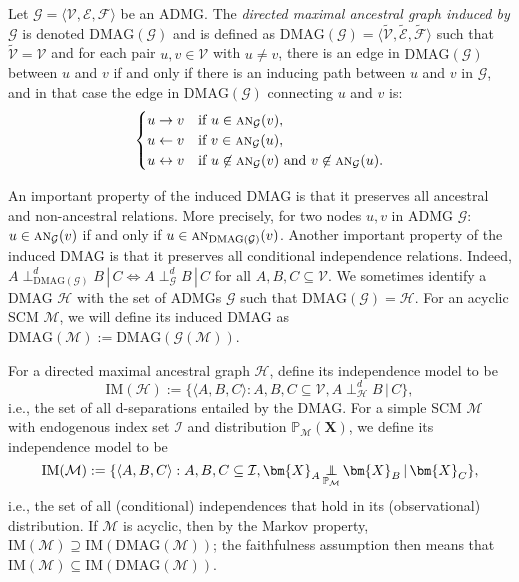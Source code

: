 \documentclass[twoside,11pt]{article}
\DeclareMathOperator*{\CI}{{\,\perp\mkern-12mu\perp\,}}
\DeclareMathOperator*{\SEP}{\perp}
\newcommand\indep[4]{{#1} \CI_{#4} {#2} \given {#3}}
\newcommand{\dsep}[4]{{#1} \SEP_{#4}^d {#2} \given {#3}}
\newcommand{\Prb}{\mathbb{P}}
\newcommand\B[1]{\bm{#1}}
\newcommand\C[1]{\mathcal{#1}}
\newcommand\mathbfsc[1]{\text{\normalfont\scshape#1}}
\newcommand\ansub[2]{\mathbfsc{an}_{#1}(#2)}
\newcommand\given{\,|\,}
\newcommand{\ot}{\leftarrow}
\newcommand{\oto}{\leftrightarrow}
\newcommand{\DMAG}{\mathrm{DMAG}}
\newcommand{\IM}{\mathrm{IM}}
\begin{document}
\begin{definition}
  Let $\C{G} = \langle \C{V}, \C{E}, \C{F} \rangle$ be an ADMG. 
  The \emph{directed maximal ancestral graph induced by $\C{G}$} is denoted $\DMAG(\C{G})$ and is defined as
  $\DMAG(\C{G}) = \langle \tilde{\C{V}}, \tilde{\C{E}}, \tilde{\C{F}} \rangle$ such that $\tilde{\C{V}} = \C{V}$ and
  for each pair $u,v \in \C{V}$ with $u \ne v$, there is an edge in $\DMAG(\C{G})$ between $u$ and $v$ if and only if 
  there is an inducing path between $u$ and $v$ in $\C{G}$, and in that case the edge in $\DMAG(\C{G})$ connecting $u$ and $v$ is:
    $$\begin{cases}
      \text{$u \to  v$} & \text{if $u \in \ansub{\C{G}}{v}$}, \\
      \text{$u \ot  v$} & \text{if $v \in \ansub{\C{G}}{u}$}, \\
      \text{$u \oto v$} & \text{if $u \not\in \ansub{\C{G}}{v}$ and $v \not\in \ansub{\C{G}}{u}$.}
    \end{cases}$$
\end{definition}
An important property of the induced DMAG is that it preserves all ancestral and non-ancestral relations.
More precisely, for two nodes $u,v$ in ADMG $\C{G}$: $u \in \ansub{\C{G}}{v}$ if and only if $u \in \ansub{\DMAG(\C{G})}{v}$.
Another important property of the induced DMAG is that it preserves all conditional independence relations.
Indeed, $\dsep{A}{B}{C}{\DMAG(\C{G})} \iff \dsep{A}{B}{C}{\C{G}}$ for all $A, B, C \subseteq \C{V}$.
We sometimes identify a DMAG $\C{H}$ with the set of ADMGs $\C{G}$ such that $\DMAG(\C{G}) = \C{H}$.
For an acyclic SCM $\C{M}$, we will define its induced DMAG as $\DMAG(\C{M}) := \DMAG(\C{G}(\C{M}))$. 

For a directed maximal ancestral graph $\C{H}$, define its independence model to be
$$\IM(\C{H}) := \{ \langle A, B, C \rangle : A, B, C \subseteq \C{V}, \dsep{A}{B}{C}{\C{H}} \},$$
i.e., the set of all d-separations entailed by the DMAG. 
For a simple SCM $\C{M}$ with endogenous index set $\C{I}$ and distribution $\Prb_{\C{M}}(\B{X})$, 
we define its independence model to be
$$\IM(\C{M}) := \{ \langle A, B, C \rangle : A, B, C \subseteq \C{I}, \indep{\B{X}_A}{\B{X}_B}{\B{X}_C}{\Prb_{\C{M}}} \},$$
i.e., the set of all (conditional) independences that hold in its (observational) distribution.
If $\C{M}$ is acyclic, then by the Markov property, $\IM(\C{M}) \supseteq \IM(\DMAG(\C{M}))$; 
the faithfulness assumption then means that $\IM(\C{M}) \subseteq \IM(\DMAG(\C{M}))$.
\end{document}
